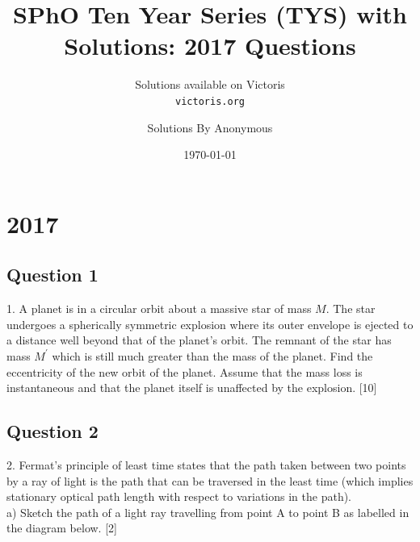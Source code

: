 \documentclass{article}
\title{SPhO Ten Year Series (TYS) with Solutions: 2017 Questions}
\author{
    Solutions available on Victoris\\
    \texttt{victoris.org}
    \and 
    Solutions By Anonymous
}
\date{\today}
\begin{document}
\maketitle


\section{2017}
\subsection{Question 1}
1. A planet is in a circular orbit about a massive star of mass $M$. The star undergoes a spherically symmetric explosion where its outer envelope is ejected to a distance well beyond that of the planet's orbit. The remnant of the star has mass $M^{\prime}$ which is still much greater than the mass of the planet. Find the eccentricity of the new orbit of the planet. Assume that the mass loss is instantaneous and that the planet itself is unaffected by the explosion. [10]

\subsection{Question 2}
2. Fermat's principle of least time states that the path taken between two points by a ray of light is the path that can be traversed in the least time (which implies stationary optical path length with respect to variations in the path). \\
a) Sketch the path of a light ray travelling from point A to point B as labelled in the diagram below. [2] \\
\end{document}
